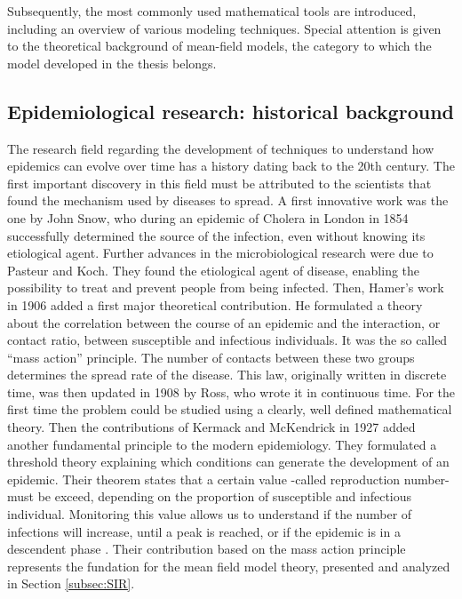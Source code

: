 Subsequently, the most commonly used mathematical tools are introduced, including an overview of various modeling techniques. Special attention is given to the theoretical background of mean-field models, the category to which the model developed in the thesis belongs.

\subsection{Epidemiological research: historical background}
\label{subsec:history}

The research field regarding the development of techniques to understand how epidemics can evolve over time has a history dating back to the 20th century. The first important discovery in this field must be attributed to the scientists that found the mechanism used by diseases to spread. 
A first innovative work was the one by John Snow, who during an epidemic of Cholera in London in 1854 successfully determined the source of the infection, even without knowing its etiological agent. Further advances in the microbiological research were due to Pasteur and Koch. They found the etiological agent of disease, enabling the possibility to treat and prevent people from being infected. Then, Hamer's work in 1906 added a first major theoretical contribution. He formulated a theory about the correlation between the course of an epidemic and the interaction, or contact ratio, between susceptible and infectious individuals. It was the so called “mass action” principle. The number of contacts between these two groups determines the spread rate of the disease. 
This law, originally written in discrete time, was then updated in 1908 by Ross, who wrote it  in continuous time. For the first time the problem could be studied using a clearly, well defined mathematical theory. Then the contributions of Kermack and McKendrick in 1927 added another fundamental principle to the modern epidemiology. They formulated a threshold theory explaining which conditions can generate the development of an epidemic. Their theorem states that a certain value -called reproduction number- must be exceed, depending on the proportion of susceptible and infectious individual. Monitoring this value allows us to understand if the number of infections will increase, until a peak is reached, or if the epidemic is in a descendent phase \cite{Mata2021, Anderson_82}. 
Their contribution based on the mass action principle represents the fundation for the mean field model theory, presented and analyzed in Section \ref{subsec:SIR}. 


